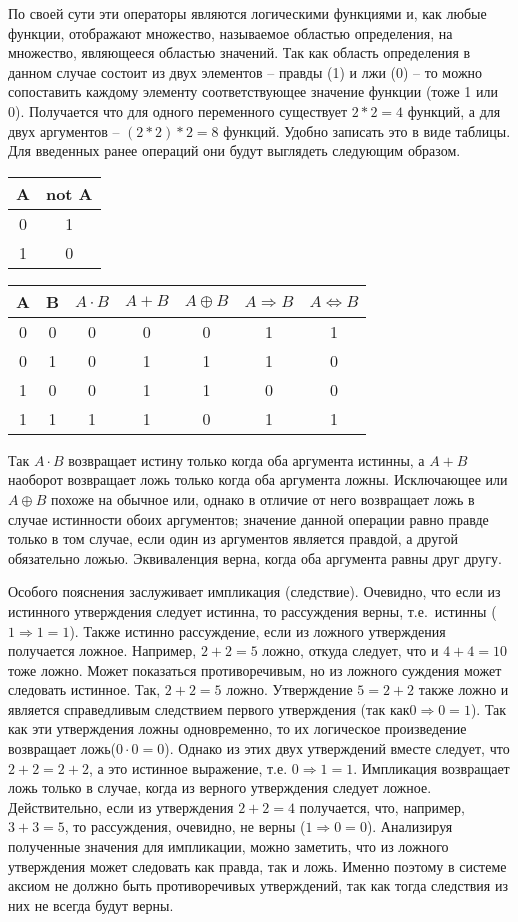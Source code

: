 По своей сути эти операторы являются логическими функциями и, как любые функции, отображают множество, называемое областью определения,  на множество, являющееся областью значений. Так как область определения в данном случае состоит из двух элементов -- правды (1) и лжи (0) -- то можно сопоставить каждому элементу соответствующее значение функции (тоже 1 или 0). Получается что для одного переменного существует $2*2=4$ функций, а для двух аргументов -- $(2*2)*2=8$ функций. Удобно записать это в виде таблицы. Для введенных ранее операций они будут выглядеть следующим образом.

\begin{tabular}{c|c}
	A&  not A\\ 
	\hline  
	0&  1\\ 
	1&  0\\  
\end{tabular} \qquad \qquad
%
\begin{tabular}{cc|c|c|c|c|c}
	A&  B&  $A \cdot B$&  $A+B$&  $A \oplus B$& $A\Rightarrow B$&  $A \Leftrightarrow B$\\ 
	\hline
	0&  0&  0&  0&  0&	1&  1\\ 
	0&  1&  0&  1&  1&	1&  0\\ 
	1&  0&  0&  1&  1&	0&  0\\ 
	1&  1&  1&  1&  0&	1&  1\\ 
\end{tabular} 

Так $A \cdot B$ возвращает истину только когда оба аргумента истинны, а $A+B$ наоборот возвращает ложь только когда оба аргумента ложны. Исключающее или $A \oplus B$ похоже на обычное или, однако в отличие от него возвращает ложь в случае истинности обоих аргументов; значение данной операции равно правде только в том случае, если один из аргументов является правдой, а другой обязательно ложью. 
Эквиваленция верна, когда оба аргумента равны друг другу.

Особого пояснения заслуживает импликация (следствие). Очевидно, что если из истинного утверждения следует истинна, то рассуждения верны, т.е.~истинны ($1\Rightarrow 1 = 1$). Также истинно рассуждение, если из ложного утверждения получается ложное. Например, $2+2 = 5$ ложно, откуда следует, что и $4+4=10$ тоже ложно. Может показаться противоречивым, но из ложного суждения может следовать истинное. Так, $2+2 = 5$ ложно. Утверждение $5=2+2$ также ложно и является справедливым следствием первого утверждения (так как$0 \Rightarrow 0 = 1$). Так как эти утверждения ложны одновременно, то их логическое произведение возвращает ложь($0\cdot 0 = 0$). Однако из этих двух утверждений вместе следует, что $2+2 = 2+2$, а это истинное выражение, т.е. $0 \Rightarrow 1 = 1$. Импликация возвращает ложь только в случае, когда из верного утверждения следует ложное. Действительно, если из утверждения $2+2=4$ получается, что, например, $3+3=5$, то рассуждения, очевидно, не верны ($1 \Rightarrow 0 = 0$). Анализируя полученные значения для импликации, можно заметить, что из ложного утверждения может следовать как правда, так и ложь. Именно поэтому в системе аксиом не должно быть противоречивых утверждений, так как тогда следствия из них не всегда будут верны. 

